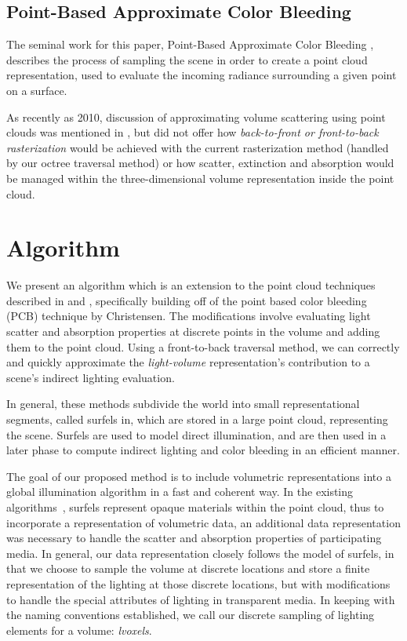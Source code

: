 \documentclass[runningheads]{llncs}
\begin{document}
\subsection{Point-Based Approximate Color Bleeding}
The seminal work for this paper, Point-Based Approximate Color Bleeding \cite{christensen:2008}, describes the process of sampling the scene in order to create a point cloud representation, used to evaluate the incoming radiance surrounding a given point on a surface.

As recently as 2010, discussion of approximating volume scattering using point clouds was mentioned in \cite{christensen:siggraph}, but did not offer how \textit{back-to-front or front-to-back rasterization} would be achieved with the current rasterization method (handled by our octree traversal method) or how scatter, extinction and absorption would be managed within the three-dimensional volume representation inside the point cloud.

\section{Algorithm}
\label{algorithm_sec}
We present an algorithm which is an extension to the point cloud techniques described in \cite{tabellion} and \cite{christensen:2008}, specifically building off of the point based color bleeding (PCB) technique by Christensen.  The modifications involve evaluating light scatter and absorption properties at discrete points in the volume and adding them to the point cloud.  Using a front-to-back traversal method, we can correctly and quickly approximate the \textit{light-volume} representation's contribution to a scene's indirect lighting evaluation.

In general, these methods subdivide the world into small representational segments, called surfels in\cite{christensen:2008}, which are stored in a large point cloud, representing the scene.  Surfels are used to model direct illumination, and are then used in a later phase to compute indirect lighting and color bleeding in an efficient manner.  

The goal of our proposed method is to include volumetric representations into a global illumination algorithm in a fast and coherent way.  In the existing algorithms~\cite{christensen:2008}, surfels represent opaque materials within the point cloud, thus to incorporate a representation of volumetric data, an additional data representation was necessary to handle the scatter and absorption properties of participating media.  In general, our data representation closely follows the model of surfels, in that we choose to sample the volume at discrete locations and store a finite representation of the lighting at those discrete locations, but with modifications to handle the special attributes of lighting in transparent media.  In keeping with the naming conventions established, we call our discrete sampling of lighting elements for a volume: \emph{lvoxels}.  
\end{document}
